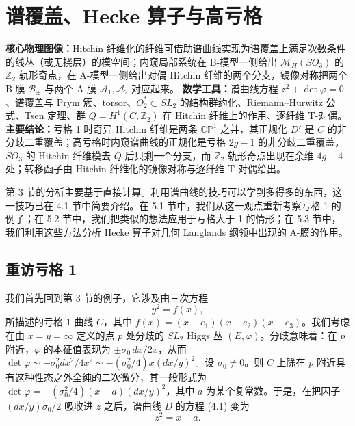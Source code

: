 

\section{谱覆盖、Hecke 算子与高亏格}

\begin{keytakeaway}
\textbf{核心物理图像：}Hitchin 纤维化的纤维可借助谱曲线实现为谱覆盖上满足次数条件的线丛（或无挠层）的模空间；内窥局部系统在 B-模型一侧给出 $\mathcal{M}_H(SO_3)$ 的 $\mathbb{Z}_2$ 轨形奇点，在 A-模型一侧给出对偶 Hitchin 纤维的两个分支，镜像对称把两个 B-膜 $\mathcal{B}_\pm$ 与两个 A-膜 $\mathcal{A}_1,\mathcal{A}_2$ 对应起来。
\textbf{数学工具：}谱曲线方程 $z^2+\det\varphi=0$、谱覆盖与 Prym 簇、torsor、$O_2^*\subset SL_2$ 的结构群约化、Riemann--Hurwitz 公式、Tsen 定理、群 $Q=H^1(C,\mathbb{Z}_2)$ 在 Hitchin 纤维上的作用、逐纤维 T-对偶。
\textbf{主要结论：}亏格 1 时奇异 Hitchin 纤维是两条 $\mathbb{CP}^1$ 之并，其正规化 $D'$ 是 $C$ 的非分歧二重覆盖；高亏格时内窥谱曲线的正规化是亏格 $2g-1$ 的非分歧二重覆盖，$SO_3$ 的 Hitchin 纤维模去 $Q$ 后只剩一个分支，而 $\mathbb{Z}_2$ 轨形奇点出现在余维 $4g-4$ 处；转移函子由 Hitchin 纤维化的镜像对称与逐纤维 T-对偶给出。
\end{keytakeaway}

第 3 节的分析主要基于直接计算。利用谱曲线的技巧可以学到多得多的东西，这一技巧已在 4.1 节中简要介绍。在 5.1 节中，我们从这一观点重新考察亏格 1 的例子；在 5.2 节中，我们把类似的想法应用于亏格大于 1 的情形；在 5.3 节中，我们利用这些方法分析 Hecke 算子对几何 Langlands 纲领中出现的 A-膜的作用。

\subsection{重访亏格 1}

我们首先回到第 3 节的例子，它涉及由三次方程
\begin{equation}\tag{5.1}
y^2 = f(x),
\end{equation}
所描述的亏格 1 曲线 $C$，其中 $f(x) = (x-e_1)(x-e_2)(x-e_3)$。我们考虑在由 $x=y=\infty$ 定义的点 $p$ 处分歧的 $SL_2$ Higgs 丛 $(E,\varphi)$。分歧意味着：在 $p$ 附近，$\varphi$ 的本征值表现为 $\pm\sigma_0\,dx/2x$，从而 $\det\varphi \sim -\sigma_0^2 dx^2/4x^2 \sim -(\sigma_0^2/4)x(dx/y)^2$。设 $\sigma_0\neq 0$。则 $C$ 上除在 $p$ 附近具有这种性态之外全纯的二次微分，其一般形式为 $\det\varphi = -(\sigma_0^2/4)(x-a)(dx/y)^2$，其中 $a$ 为某个复常数。于是，在把因子 $(dx/y)\sigma_0/2$ 吸收进 $z$ 之后，谱曲线 $D$ 的方程 (4.1) 变为
\begin{equation}\tag{5.2}
z^2 = x - a.
\end{equation}

